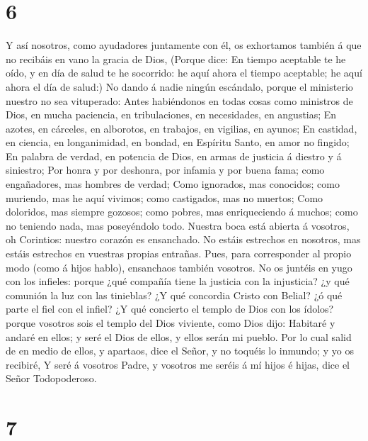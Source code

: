 \hypertarget{section-5}{%
\section{6}\label{section-5}}

 Y así nosotros, como ayudadores juntamente con él, os
exhortamos también á que no recibáis en vano la gracia de Dios,
 (Porque dice: En tiempo aceptable te he oído, y en día de
salud te he socorrido: he aquí ahora el tiempo aceptable; he aquí ahora
el día de salud:)  No dando á nadie ningún escándalo,
porque el ministerio nuestro no sea vituperado:  Antes
habiéndonos en todas cosas como ministros de Dios, en mucha paciencia,
en tribulaciones, en necesidades, en angustias;  En
azotes, en cárceles, en alborotos, en trabajos, en vigilias, en ayunos;
 En castidad, en ciencia, en longanimidad, en bondad, en
Espíritu Santo, en amor no fingido;  En palabra de verdad,
en potencia de Dios, en armas de justicia á diestro y á siniestro;
 Por honra y por deshonra, por infamia y por buena fama;
como engañadores, mas hombres de verdad;  Como ignorados,
mas conocidos; como muriendo, mas he aquí vivimos; como castigados, mas
no muertos;  Como doloridos, mas siempre gozosos; como
pobres, mas enriqueciendo á muchos; como no teniendo nada, mas
poseyéndolo todo.  Nuestra boca está abierta á vosotros,
oh Corintios: nuestro corazón es ensanchado.  No estáis
estrechos en nosotros, mas estáis estrechos en vuestras propias
entrañas.  Pues, para corresponder al propio modo (como á
hijos hablo), ensanchaos también vosotros.  No os juntéis
en yugo con los infieles: porque ¿qué compañía tiene la justicia con la
injusticia? ¿y qué comunión la luz con las tinieblas?  ¿Y
qué concordia Cristo con Belial? ¿ó qué parte el fiel con el infiel?
 ¿Y qué concierto el templo de Dios con los ídolos?
porque vosotros sois el templo del Dios viviente, como Dios dijo:
Habitaré y andaré en ellos; y seré el Dios de ellos, y ellos serán mi
pueblo.  Por lo cual salid de en medio de ellos, y
apartaos, dice el Señor, y no toquéis lo inmundo; y yo os recibiré,
 Y seré á vosotros Padre, y vosotros me seréis á mí hijos
é hijas, dice el Señor Todopoderoso.

\hypertarget{section-6}{%
\section{7}\label{section-6}}

